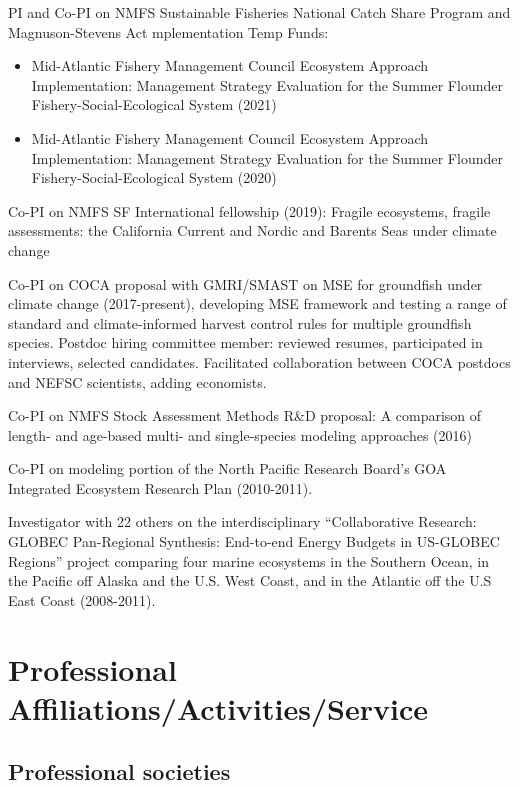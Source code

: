 \documentclass[11pt, a4paper]{awesome-cv}
\begin{document}
PI and Co-PI on NMFS Sustainable Fisheries National Catch Share Program
and Magnuson-Stevens Act mplementation Temp Funds:

\begin{itemize}
\item
  Mid-Atlantic Fishery Management Council Ecosystem Approach
  Implementation: Management Strategy Evaluation for the Summer Flounder
  Fishery-Social-Ecological System (2021)
\item
  Mid-Atlantic Fishery Management Council Ecosystem Approach
  Implementation: Management Strategy Evaluation for the Summer Flounder
  Fishery-Social-Ecological System (2020)
\end{itemize}

Co-PI on NMFS SF International fellowship (2019): Fragile ecosystems,
fragile assessments: the California Current and Nordic and Barents Seas
under climate change

Co-PI on COCA proposal with GMRI/SMAST on MSE for groundfish under
climate change (2017-present), developing MSE framework and testing a
range of standard and climate-informed harvest control rules for
multiple groundfish species. Postdoc hiring committee member: reviewed
resumes, participated in interviews, selected candidates. Facilitated
collaboration between COCA postdocs and NEFSC scientists, adding
economists.

Co-PI on NMFS Stock Assessment Methods R\&D proposal: A comparison of
length- and age-based multi- and single-species modeling approaches
(2016)

Co-PI on modeling portion of the North Pacific Research Board's GOA
Integrated Ecosystem Research Plan (2010-2011).

Investigator with 22 others on the interdisciplinary ``Collaborative
Research: GLOBEC Pan-Regional Synthesis: End-to-end Energy Budgets in
US-GLOBEC Regions'' project comparing four marine ecosystems in the
Southern Ocean, in the Pacific off Alaska and the U.S. West Coast, and
in the Atlantic off the U.S East Coast (2008-2011).

\hypertarget{professional-affiliationsactivitiesservice}{%
\section{Professional
Affiliations/Activities/Service}\label{professional-affiliationsactivitiesservice}}

\hypertarget{professional-societies}{%
\subsection{Professional societies}\label{professional-societies}}
\end{document}
